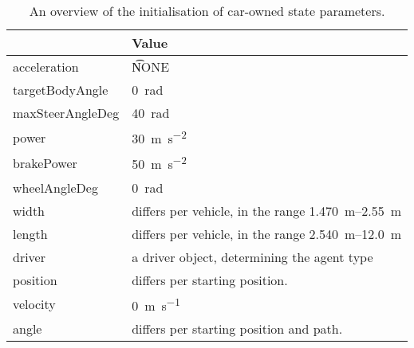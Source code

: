 \begin{table}
	\centering
	\begin{tabularx}{\textwidth}{>{\ttfamily}lX}
		\toprule
		\normalfont{Parameter}	& Value \\  
		\midrule
		acceleration 			
			& \t{NONE} \\ 
		targetBodyAngle 		
			& \SI[mode=text]{0}{\radian} \\ 
		maxSteerAngleDeg 		
			& \SI[mode=text]{40}{\radian} \\ 
		power 					
			& \SI[mode=text]{30}{\meter\per\square\second}\\ 
		brakePower 		
			& \SI{50}{\meter\per\square\second}\\
		wheelAngleDeg 			
			& \SI[mode=text]{0}{\radian} \\ 
		width 					
			& differs per vehicle, in the range \SIrange{1.470}{2.55}{\meter} \\ 
		length 					
			& differs per vehicle, in the range \SIrange{2.540}{12.0}{\meter} \\ 
		driver 					
			& a driver object, determining the agent type \\
		position 		
			& differs per starting position. \\
		velocity
			& \SI[mode=text]{0}{\meter\per\second}\\
		angle
			& differs per starting position and path. \\
		\bottomrule
	\end{tabularx}
	\caption{An overview of the initialisation of car-owned state parameters.}
	\label{tab:par:method:model:details:init:car:value}
\end{table} 

